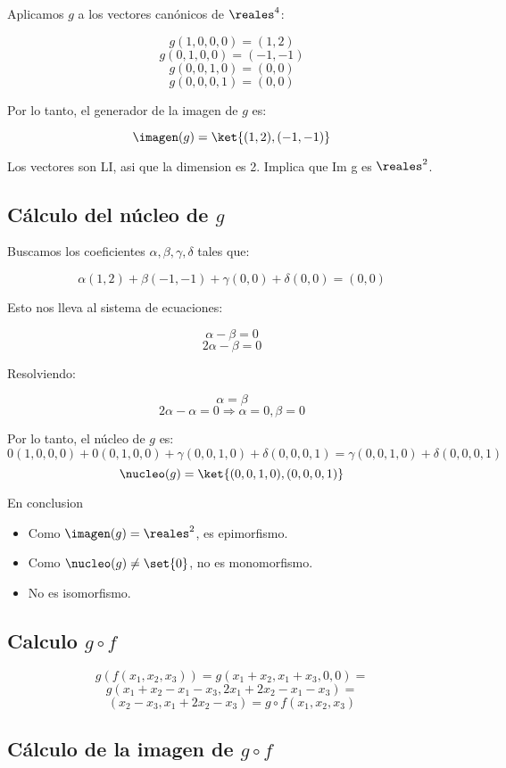 Aplicamos $g$ a los vectores canónicos de $\reales^4$:

$$ g(1,0,0,0) = (1,2) $$
$$ g(0,1,0,0) = (-1,-1) $$
$$ g(0,0,1,0) = (0,0) $$
$$ g(0,0,0,1) = (0,0) $$

Por lo tanto, el generador de la imagen de $ g $ es:

$$ \imagen(g) = \ket{(1,2), (-1,-1)} $$

Los vectores son LI, asi que la dimension es 2. Implica que Im g es $ \reales^2 $.

\subsection*{Cálculo del núcleo de $ g $}

Buscamos los coeficientes $ \alpha, \beta, \gamma, \delta $ tales que:

$$ \alpha(1,2) + \beta(-1,-1) + \gamma(0,0) + \delta(0,0) = (0,0) $$

Esto nos lleva al sistema de ecuaciones:

$$ \alpha - \beta = 0 $$
$$ 2\alpha - \beta = 0 $$

Resolviendo:

$$ \alpha = \beta $$
$$ 2\alpha - \alpha = 0 \Rightarrow \alpha = 0, \beta = 0 $$

Por lo tanto, el núcleo de $ g $ es:
$$ 0(1,0,0,0) + 0(0,1,0,0) + \gamma(0,0,1,0) + \delta(0,0,0,1) = \gamma(0,0,1,0) + \delta(0,0,0,1) $$
$$ \nucleo(g) = \ket{(0,0,1,0), (0,0,0,1)} $$

En conclusion

\begin{itemize}
  \item Como $ \imagen(g) = \reales^2 $, es epimorfismo.
  \item Como $ \nucleo(g) \neq \set{0} $, no es monomorfismo.
  \item No es isomorfismo.
\end{itemize}

\subsection*{Calculo $ g\circ f $}
$$ g(f(x_1,x_2,x_3)) = g(x_1+x_2,x_1+x_3,0,0) =$$
$$ g(x_1+x_2-x_1-x_3,2x_1+2x_2-x_1-x_3) =   $$
$$ (x_2-x_3,x_1+2x_2-x_3) = g\circ f (x_1,x_2,x_3) $$

\subsection*{Cálculo de la imagen de $ g\circ f $}

